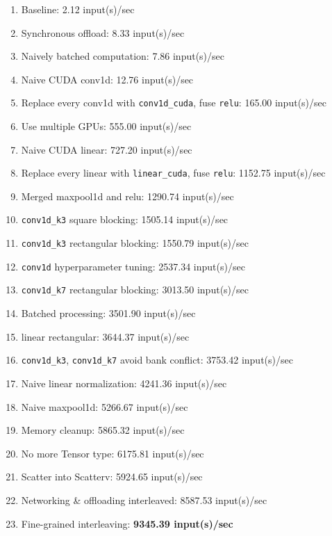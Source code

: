 \begin{enumerate}
    \item Baseline: 2.12 input(s)/sec
    \item Synchronous offload: 8.33 input(s)/sec
    \item Naively batched computation: 7.86 input(s)/sec
    \item Naive CUDA conv1d: 12.76 input(s)/sec
    \item Replace every conv1d with \texttt{conv1d\_cuda}, fuse \texttt{relu}: 165.00 input(s)/sec
    \item Use multiple GPUs: 555.00 input(s)/sec
    \item Naive CUDA linear: 727.20 input(s)/sec
    \item Replace every linear with \texttt{linear\_cuda}, fuse \texttt{relu}: 1152.75 input(s)/sec
    \item Merged maxpool1d and relu: 1290.74 input(s)/sec
    \item \texttt{conv1d\_k3} square blocking: 1505.14 input(s)/sec
    \item \texttt{conv1d\_k3} rectangular blocking: 1550.79 input(s)/sec
    \item \texttt{conv1d} hyperparameter tuning: 2537.34 input(s)/sec
    \item \texttt{conv1d\_k7} rectangular blocking: 3013.50 input(s)/sec
    \item Batched processing: 3501.90 input(s)/sec
    \item linear rectangular: 3644.37 input(s)/sec
    \item \texttt{conv1d\_k3}, \texttt{conv1d\_k7} avoid bank conflict: 3753.42 input(s)/sec
    \item Naive linear normalization: 4241.36 input(s)/sec
    \item Naive maxpool1d: 5266.67 input(s)/sec
    \item Memory cleanup: 5865.32 input(s)/sec
    \item No more Tensor type: 6175.81 input(s)/sec
    \item Scatter into Scatterv: 5924.65 input(s)/sec
    \item Networking \& offloading interleaved: 8587.53 input(s)/sec
    \item Fine-grained interleaving: \textbf{9345.39 input(s)/sec}
\end{enumerate}
